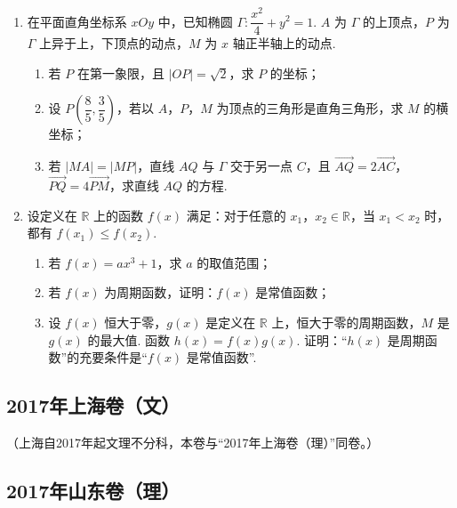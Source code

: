 \begin{description}
\begin{enumerate}[leftmargin=5pt]
        \item 在平面直角坐标系 \(xOy\) 中，已知椭圆 \(\Gamma:\dfrac{x^2}{4}+y^2=1\). \(A\) 为 \(\Gamma\) 的上顶点，\(P\) 为 \(\Gamma\) 上异于上，下顶点的动点，\(M\) 为 \(x\) 轴正半轴上的动点.

\begin{enumerate}
\item 若 \(P\) 在第一象限，且 \(\lvert OP\rvert=\sqrt2\)，求 \(P\) 的坐标；
\item 设 \(P\left(\dfrac85,\dfrac35\right)\)，若以 \(A\)，\(P\)，\(M\) 为顶点的三角形是直角三角形，求 \(M\) 的横坐标；
\item 若 \(\lvert MA\rvert=\lvert MP\rvert\)，直线 \(AQ\) 与 \(\Gamma\) 交于另一点 \(C\)，且 \(\overrightarrow{AQ}=2\overrightarrow{AC}\)，\(\overrightarrow{PQ}=4\overrightarrow{PM}\)，求直线 \(AQ\) 的方程.
\end{enumerate}

        \item 设定义在 \(\mathbb{R}\) 上的函数 \(f(x)\) 满足：对于任意的 \(x_1\)，\(x_2\in\mathbb{R}\)，当 \(x_1<x_2\) 时，都有 \(f(x_1)\le f(x_2)\).

\begin{enumerate}
\item 若 \(f(x)=ax^3+1\)，求 \(a\) 的取值范围；
\item 若 \(f(x)\) 为周期函数，证明：\(f(x)\) 是常值函数；
\item 设 \(f(x)\) 恒大于零，\(g(x)\) 是定义在 \(\mathbb{R}\) 上，恒大于零的周期函数，\(M\) 是 \(g(x)\) 的最大值. 函数 \(h(x)=f(x)g(x)\). 证明：“\(h(x)\) 是周期函数”的充要条件是“\(f(x)\) 是常值函数”.
\end{enumerate}

    \end{enumerate}

\end{description}


\subsection{2017年上海卷（文）}\label{gk:2017年上海卷（文）}

（上海自2017年起文理不分科，本卷与“2017年上海卷（理）”同卷。）


\subsection{2017年山东卷（理）}\label{gk:2017年山东卷（理）}

